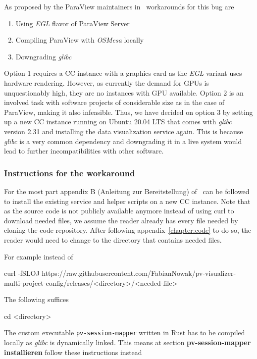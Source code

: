As proposed by the ParaView maintainers in~\cite{paraviewUsingUbuntu}
workarounds for this bug are

\begin{enumerate}
    \item Using \textit{EGL} flavor of ParaView Server
    \item Compiling ParaView with \textit{OSMesa} locally
    \item Downgrading \textit{glibc}
\end{enumerate}

Option 1 requires a CC instance with a graphics card as the \textit{EGL} variant
uses hardware rendering. However, as currently the demand for GPUs is
unquestionably high, they are no instances with GPU available. Option 2 is an
involved task with software projects of considerable size as in the case of
ParaView, making it also infeasible. Thus, we have decided on option 3 by
setting up a new CC instance running on Ubuntu 20.04 LTS that comes with
\textit{glibc} version 2.31 and installing the data visualization service again.
This is because \textit{glibc} is a very common dependency and downgrading it in
a live system would lead to further incompatibilities with other software.

\subsubsection*{Instructions for the workaround}

For the most part appendix B (Anleitung zur Bereitstellung)
of~\cite{nowak2024pvw} can be followed to install the existing service and
helper scripts on a new CC instance. Note that as the source code is not
publicly available anymore instead of using curl to download needed files, we
assume the reader already has every file needed by cloning the code repository.
After following appendix~\ref{chapter:code} to do so, the reader would need to
change to the directory that contains needed files. 

For example instead of
\begin{terminal}
    curl -fSLOJ https://raw.githubusercontent.com/FabianNowak/pv-visualizer-multi-project-config/releases/<directory>/<needed-file>
\end{terminal}

The following suffices
\begin{terminal}
    cd <directory>
\end{terminal}

The custom executable \texttt{pv-session-mapper} written in Rust has to be
compiled locally as \textit{glibc} is dynamically linked. This means at section
\textbf{pv-session-mapper installieren} follow these instructions instead

